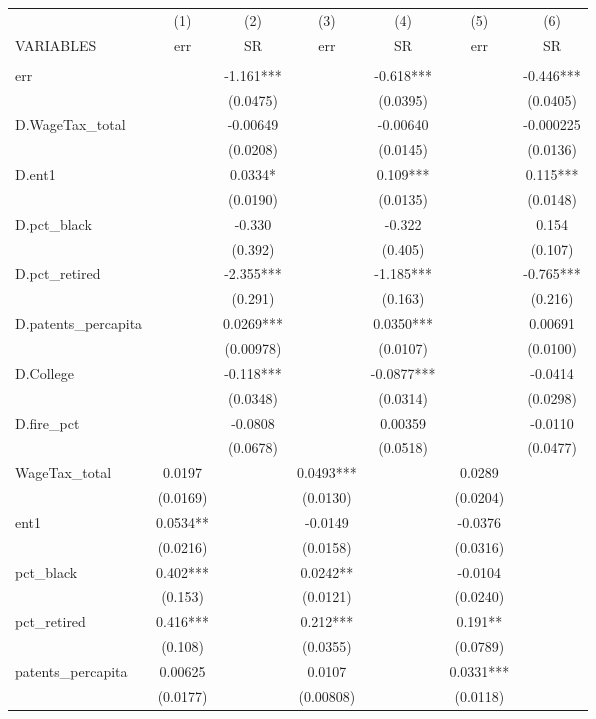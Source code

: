 \begin{tabular}{lcccccc} \hline
 & (1) & (2) & (3) & (4) & (5) & (6) \\
VARIABLES & err & SR & err & SR & err & SR \\ \hline
 &  &  &  &  &  &  \\
err &  & -1.161*** &  & -0.618*** &  & -0.446*** \\
 &  & (0.0475) &  & (0.0395) &  & (0.0405) \\
D.WageTax\_total &  & -0.00649 &  & -0.00640 &  & -0.000225 \\
 &  & (0.0208) &  & (0.0145) &  & (0.0136) \\
D.ent1 &  & 0.0334* &  & 0.109*** &  & 0.115*** \\
 &  & (0.0190) &  & (0.0135) &  & (0.0148) \\
D.pct\_black &  & -0.330 &  & -0.322 &  & 0.154 \\
 &  & (0.392) &  & (0.405) &  & (0.107) \\
D.pct\_retired &  & -2.355*** &  & -1.185*** &  & -0.765*** \\
 &  & (0.291) &  & (0.163) &  & (0.216) \\
D.patents\_percapita &  & 0.0269*** &  & 0.0350*** &  & 0.00691 \\
 &  & (0.00978) &  & (0.0107) &  & (0.0100) \\
D.College &  & -0.118*** &  & -0.0877*** &  & -0.0414 \\
 &  & (0.0348) &  & (0.0314) &  & (0.0298) \\
D.fire\_pct &  & -0.0808 &  & 0.00359 &  & -0.0110 \\
 &  & (0.0678) &  & (0.0518) &  & (0.0477) \\
WageTax\_total & 0.0197 &  & 0.0493*** &  & 0.0289 &  \\
 & (0.0169) &  & (0.0130) &  & (0.0204) &  \\
ent1 & 0.0534** &  & -0.0149 &  & -0.0376 &  \\
 & (0.0216) &  & (0.0158) &  & (0.0316) &  \\
pct\_black & 0.402*** &  & 0.0242** &  & -0.0104 &  \\
 & (0.153) &  & (0.0121) &  & (0.0240) &  \\
pct\_retired & 0.416*** &  & 0.212*** &  & 0.191** &  \\
 & (0.108) &  & (0.0355) &  & (0.0789) &  \\
patents\_percapita & 0.00625 &  & 0.0107 &  & 0.0331*** &  \\
 & (0.0177) &  & (0.00808) &  & (0.0118) &  \\

\end{tabular}
